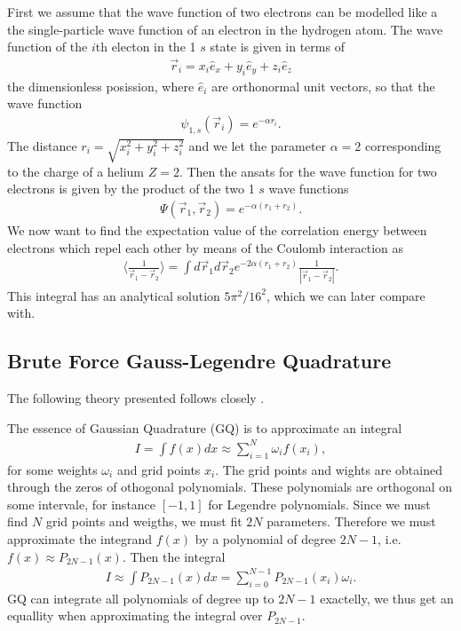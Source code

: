 \documentclass[twocolumn]{aastex62}
\begin{document}
First we assume that the wave function of two electrons can be modelled like a the single-particle wave function of an electron in the hydrogen atom. The wave function of the $i$th electon in the 1 $s$ state is given in terms of
\begin{align}
	\vec{r}_i = x_i \hat{e}_x + y_i\hat{e}_y + z_i\hat{e}_z
\end{align} 
the dimensionless posission, where $\hat{e}_i$ are orthonormal unit vectors, so that the wave function
\begin{align}
	\psi_{1,s}(\vec{r}_i) = e^{-\alpha r_i}.
\end{align}
The distance $r_i = \sqrt{x_i^2 + y_i^2 + z_i^2}$ and we let the parameter $\alpha = 2$ corresponding to the charge of a helium $Z = 2$. Then the ansats for the wave function for two electrons is given by the product of the two 1 $s$ wave functions 
\begin{align}
	\Psi(\vec{r}_1, \vec{r}_2) = e^{-\alpha(r_1 + r_2)}.
\end{align}
We now want to find the expectation value of the correlation energy between electrons which repel each other by means of the Coulomb interaction as 
\begin{align}
\label{eq:cartint}
\langle \frac{
1}{\vec{r}_1 - \vec{r}_2}\rangle = \int d\vec{r}_1d\vec{r}_2 e^{-2\alpha(r_1 + r_2)}\frac{1}{|\vec{r}_1 - \vec{r}_2|}.
\end{align}
This integral has an analytical solution $5\pi^2/16^2$, which we can later compare with.
\subsection{Brute Force Gauss-Legendre Quadrature}
The following theory presented follows closely \citep[Ch. 5.3]{jensen:2019}. 

The essence of Gaussian Quadrature (GQ) is to approximate an integral 
\begin{align}
	I = \int f(x) dx \approx \sum^N_{i = 1} \omega_i f(x_i),
\end{align} 
for some weights $\omega_i$ and grid points $x_i$. The grid points and wights are obtained through the zeros of othogonal polynomials. These polynomials are orthogonal on some intervale, for instance $[-1, 1]$ for Legendre polynomials. Since we must find $N$ grid points and weigths, we must fit $2N$ parameters. Therefore we must approximate the integrand $f(x)$ by a polynomial of degree $2N-1$, i.e. $f(x) \approx P_{2N-1}(x)$. Then the integral 
\begin{align}
	I \approx \int P_{2N-1}(x)dx = \sum^{N-1}_{i=0}P_{2N-1}(x_i) \omega_i.
\end{align} 
GQ can integrate all polynomials of degree up to $2N-1$ exactelly, we thus get an equallity when approximating the integral over $P_{2N-1}$. 
\end{document}
